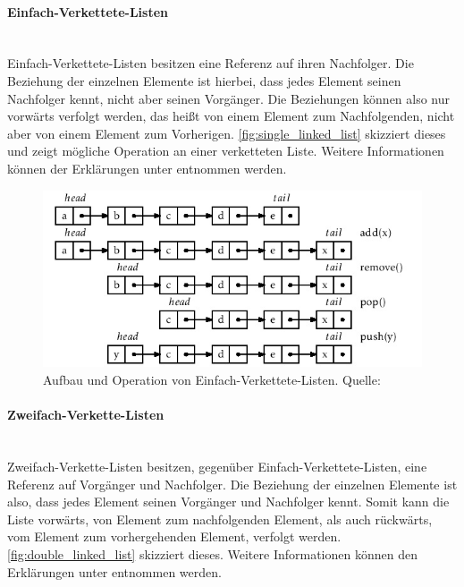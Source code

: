 \documentclass[a4paper]{article}
\begin{document}
	\paragraph{Einfach-Verkettete-Listen}\mbox{} \\
	
	Einfach-Verkettete-Listen besitzen eine Referenz auf ihren Nachfolger.
	Die Beziehung der einzelnen Elemente ist hierbei, dass jedes Element
	seinen Nachfolger kennt, nicht aber seinen Vorgänger. Die Beziehungen
	können also nur vorwärts verfolgt werden, das heißt von einem Element
	zum Nachfolgenden, nicht aber von einem Element zum Vorherigen.
	\autoref{fig:single_linked_list} skizziert dieses und zeigt mögliche
	Operation an einer verketteten Liste. Weitere Informationen können
	der Erklärungen unter \cite{SLList} entnommen werden.
	
	\begin{figure}[H] 
		\includegraphics[width=\linewidth]{../Bilder/single_linked_list.jpg}
		\caption
		{
			Aufbau und Operation von Einfach-Verkettete-Listen.
			Quelle: \cite{SLList}
		}
		\label{fig:single_linked_list}
	\end{figure}	
	
	\paragraph{Zweifach-Verkette-Listen}\mbox{} \\
	
	Zweifach-Verkette-Listen besitzen, gegenüber Einfach-Verkettete-Listen,
	eine Referenz auf Vorgänger und Nachfolger. Die Beziehung der einzelnen
	Elemente ist also, dass jedes Element seinen Vorgänger und Nachfolger
	kennt. Somit kann die Liste vorwärts, von Element zum nachfolgenden
	Element, als auch rückwärts, vom Element zum vorhergehenden Element,
	verfolgt werden. \autoref{fig:double_linked_list} skizziert dieses.
	Weitere Informationen können den Erklärungen unter \cite{DLList} entnommen
	werden.
	
\end{document}
